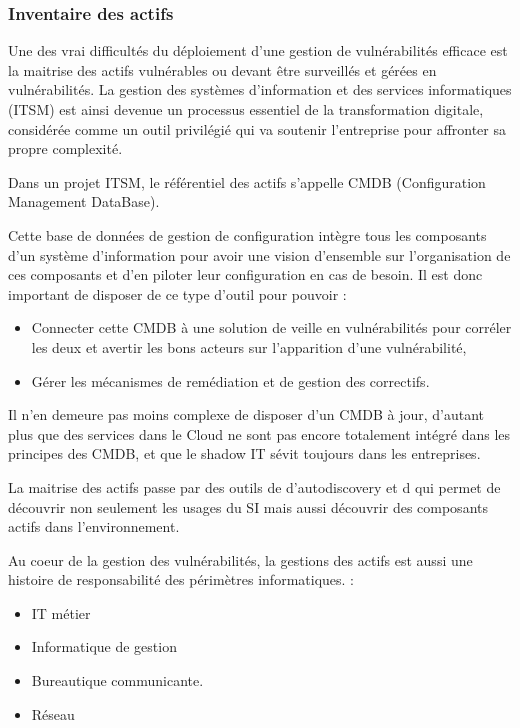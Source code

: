 \subsubsection{Inventaire des actifs}

Une des vrai difficultés du déploiement d'une gestion de vulnérabilités efficace est la maitrise des actifs vulnérables ou devant être surveillés et gérées en vulnérabilités.
La gestion des systèmes d'information et des services informatiques (ITSM) est ainsi devenue un processus essentiel de la transformation digitale, considérée comme un outil privilégié qui va soutenir l’entreprise pour affronter sa propre complexité.

Dans un projet ITSM, le référentiel des actifs s’appelle CMDB (Configuration Management DataBase).

Cette base de données de gestion de configuration intègre  tous les composants d’un système d'information pour  avoir une vision d’ensemble sur l’organisation de ces composants et d’en piloter leur configuration en cas de besoin.
Il est donc important de disposer de ce type d'outil pour pouvoir :

\begin{itemize}
  \item Connecter cette CMDB à une solution de veille en vulnérabilités pour corréler les deux et avertir les bons acteurs sur l'apparition d'une vulnérabilité,
\item Gérer les mécanismes de remédiation et de gestion des correctifs.
\end{itemize}

Il n'en demeure pas moins complexe de disposer d'un CMDB à jour, d'autant plus que des services dans le Cloud ne sont pas encore totalement intégré dans les principes des CMDB, et que le shadow IT  sévit toujours dans les entreprises.

La maitrise des actifs passe par des outils de d'autodiscovery et d qui permet de découvrir non seulement les usages du SI mais aussi découvrir des composants actifs dans l'environnement.

Au coeur de la gestion des vulnérabilités, la gestions des actifs est aussi une histoire de responsabilité des périmètres  informatiques. :

\begin{itemize}
  \item IT métier
  \item Informatique de gestion
  \item Bureautique communicante.
  \item Réseau
\end{itemize}



